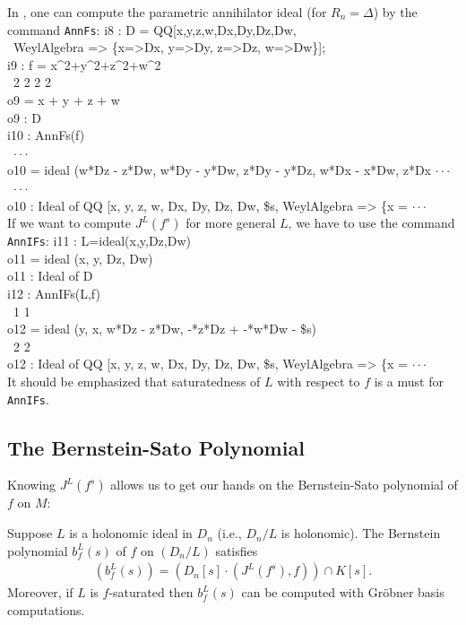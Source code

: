In \Mtwo, one can compute the parametric annihilator ideal (for
$R_n=\Delta$) by the command {\tt AnnFs}:
\beginOutput
i8 : D = QQ[x,y,z,w,Dx,Dy,Dz,Dw, \\
\            WeylAlgebra => \{x=>Dx, y=>Dy, z=>Dz, w=>Dw\}];\\
\endOutput
\beginOutput
i9 : f = x^2+y^2+z^2+w^2\\
\emptyLine
\      2    2    2    2\\
o9 = x  + y  + z  + w\\
\emptyLine
o9 : D\\
\endOutput
\beginOutput
i10 : AnnFs(f)\\
\emptyLine
\                                                                       $\cdot\cdot\cdot$\\
o10 = ideal (w*Dz - z*Dw, w*Dy - y*Dw, z*Dy - y*Dz, w*Dx - x*Dw, z*Dx  $\cdot\cdot\cdot$\\
\                                                                       $\cdot\cdot\cdot$\\
\emptyLine
o10 : Ideal of QQ [x, y, z, w, Dx, Dy, Dz, Dw, \$s, WeylAlgebra => \{x = $\cdot\cdot\cdot$\\
\endOutput
If we want to compute $J^L(f^s)$ 
for more general $L$, we have to use
the command {\tt AnnIFs}:
\beginOutput
i11 : L=ideal(x,y,Dz,Dw)\\
\emptyLine
o11 = ideal (x, y, Dz, Dw)\\
\emptyLine
o11 : Ideal of D\\
\endOutput
\beginOutput
i12 : AnnIFs(L,f)\\
\emptyLine
\                                1        1\\
o12 = ideal (y, x, w*Dz - z*Dw, -*z*Dz + -*w*Dw - \$s)\\
\                                2        2\\
\emptyLine
o12 : Ideal of QQ [x, y, z, w, Dx, Dy, Dz, Dw, \$s, WeylAlgebra => \{x = $\cdot\cdot\cdot$\\
\endOutput
It should be emphasized that saturatedness of $L$ with respect to $f$ is
a must for {\tt AnnIFs}. 

\subsection{The Bernstein-Sato Polynomial}
Knowing $J^L(f^s)$ allows us to get our hands on the Bernstein-Sato
polynomial of $f$ on $M$:

\begin{corollary}
Suppose $L$ is a holonomic ideal in $D_n$ (i.e., $D_n/L$ is holonomic). 
The
Bernstein polynomial $b_f^L(s)$ of $f$ on $(D_n/L)$ satisfies 
\begin{eqnarray}
(b^L_f(s))=\left(D_n[s]\cdot(J^L(f^s),f)\right)\cap K[s].
\end{eqnarray}
Moreover, if $L$ is $f$-saturated then
$b^L_f(s)$ can be computed with Gr\"obner basis computations.
\end{corollary}

